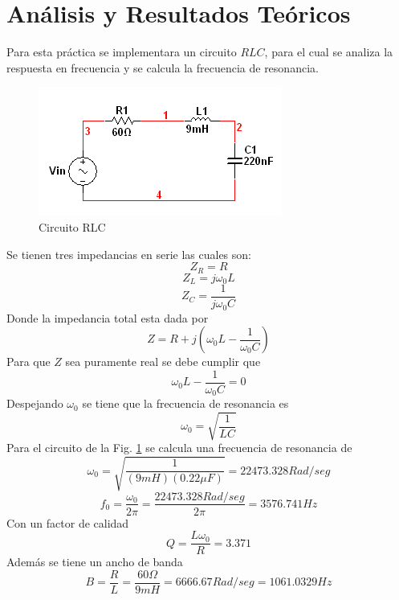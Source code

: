 \documentclass[twocolumn]{IEEEtran}
\begin{document}
\section{Análisis y Resultados Teóricos}
\noindent
Para esta práctica se implementara un circuito $RLC$, para el cual se analiza la respuesta en frecuencia y se calcula la frecuencia de resonancia.
\begin{figure}[H]
	\centering
		\includegraphics[scale=0.8]{circ1.PNG}
	\caption{Circuito RLC}
	\label{circ1}
\end{figure}
\noindent
Se tienen tres impedancias en serie las cuales son:
\begin{equation}
Z_R=R
\label{ecuR}
\end{equation}
\begin{equation}
Z_L=j \omega_0 L
\label{ecuL}
\end{equation}
\begin{equation}
Z_C =  \frac{1}{j\omega_0 C}
\label{ecuC}
\end{equation}
\noindent
Donde la impedancia total esta dada por
\begin{equation}
Z= R + j(\omega_0 L - \frac{1}{\omega_0 C})
\label{ecu101}
\end{equation}
\noindent
Para que $Z$ sea puramente real se debe cumplir que
\begin{equation}
\omega_0 L - \frac{1}{\omega_0 C}=0
\label{ecu102}
\end{equation}
\noindent
Despejando $\omega_0$ se tiene que la frecuencia de resonancia es
\begin{equation}
\omega_0=\sqrt{\frac{1}{LC}}
\label{ecu103}
\end{equation}
\noindent
Para el circuito de la Fig. \ref{circ1} se calcula una frecuencia de resonancia de
\begin{equation}
\omega_0=\sqrt{\frac{1}{(9mH)(0.22\mu F)}}=22473.328 Rad/seg
\label{ecu104}
\end{equation}
\noindent
\begin{equation}
f_0=\frac{\omega_0}{2 \pi}=\frac{22473.328Rad/seg}{2 \pi}=3576.741 Hz
\label{ecu104}
\end{equation}
\noindent
Con un factor de calidad
\begin{equation}
Q=\frac{L\omega_0}{R}=3.371
\label{ecu104}
\end{equation}
\noindent
Además  se tiene un ancho de banda
\begin{equation}
B=\frac{R}{L}=\frac{60\Omega}{9mH}=6666.67 Rad/seg=1061.0329 Hz
\label{ecu104}
\end{equation}
\end{document}
